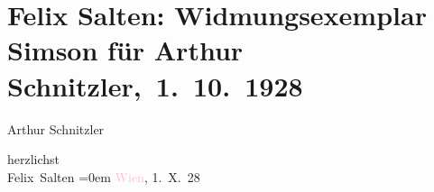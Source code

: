 

\renewcommand{\erwaehntePersonen}{Personen: Felix Salten}
\renewcommand{\erwaehnteInstitutionen}{Institutionen: Paul Zsolnay Verlag}
\renewcommand{\erwaehnteOrte}{Orte: Berlin, Leipzig, Wien}
\renewcommand{\erwaehnteWerke}{Werke: Simson. Das Schicksal eines Erwählten}
\section[ Felix Salten: Widmungsexemplar Simson für Arthur Schnitzler, 1. 10. 1928]{Felix Salten: Widmungsexemplar Simson für Arthur
               Schnitzler, 1. 10. 1928}
\nopagebreak{}
\rehead{ }\normalsize\beginnumbering{}
\toendnotes[C]{\smallbreak\pagebreak[2]}
\pstart
           \noindent{}\centering{}{\pb}\textcolor{gray}{\textbf{\textsc{}}}\pend
           
\pstart
           \noindent{}\centering{}\textcolor{gray}{\textbf{}}\pend
           
\pstart
           \noindent{}\centering{}\textcolor{gray}{\textbf{}}\pend
           
\pstart
           \noindent{}Arthur Schnitzler\pend
           
\pstart
           herzlichst {\\[\baselineskip]}\spacefill\mbox{Felix Salten}\pend
           \leftskip=0em{}
\pstart
           \textcolor{pink}{Wien}{}\ledrightnote{\textcolor{pink}{Wien}}, 1. X. 28\pend
           {\bigskip}
\pstart
           \noindent{}\centering{}{\pb}\textcolor{gray}{\textbf{\textsc{}}}\pend
           
\pstart
           \noindent{}\centering{}\textcolor{gray}{\textbf{\textcolor{green}{\textbf{}}{}\ledrightnote{\textcolor{green}{Simson. Das Schicksal eines Erwählten}}}}\pend
           
\pstart
           \noindent{}\centering{}\textcolor{gray}{\textbf{}}\pend
           
\pstart
           \noindent{}\centering{}\textcolor{gray}{\textbf{\textsc{}}}\pend
           {\bigskip}
\pstart
           \noindent{}\centering{}\textcolor{gray}{\textbf{}}\pend
           
